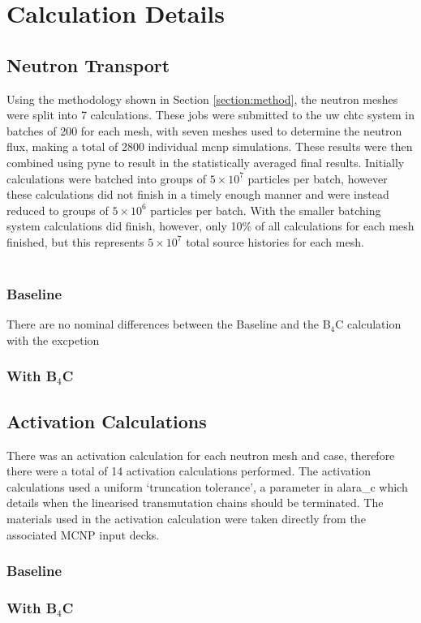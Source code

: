 \documentclass[12pt]{article}
\begin{document}
\section{Calculation Details}
\subsection{Neutron Transport}
Using the methodology shown in Section \ref{section:method}, the neutron meshes
were split into 7 calculations. These jobs were submitted to the \gls{uw}
\gls{chtc} system in batches of 200 for each mesh, with seven meshes used to
determine the neutron flux, making a
total of 2800 individual \gls{mcnp} simulations. These results were then
combined using \gls{pyne} to result in the statistically averaged final results.
Initially calculations were batched into groups of $5\times10^7$ particles per
batch, however these calculations did not finish in a timely enough manner and
were instead reduced to groups of $5\times10^6$ particles per batch. With the
smaller batching system calculations did finish, however, only 10\% of all
calculations for each mesh finished, but this represents $5\times10^7$ total
source histories for each mesh.
\\
\\
\subsubsection{Baseline}
There are no nominal differences between the Baseline and the B$_4$C calculation
with the excpetion
\subsubsection{With B$_4$C}
\subsection{Activation Calculations}
There was an activation calculation for each neutron mesh and case, therefore
there were a total of 14 activation calculations performed. The activation
calculations used a uniform `truncation tolerance', a parameter in \gls{alara_c}
which details when the linearised transmutation chains should be terminated. The
materials used in the activation calculation were taken directly from the 
associated MCNP input decks.
\subsubsection{Baseline}
\subsubsection{With B$_4$C}
\end{document}
